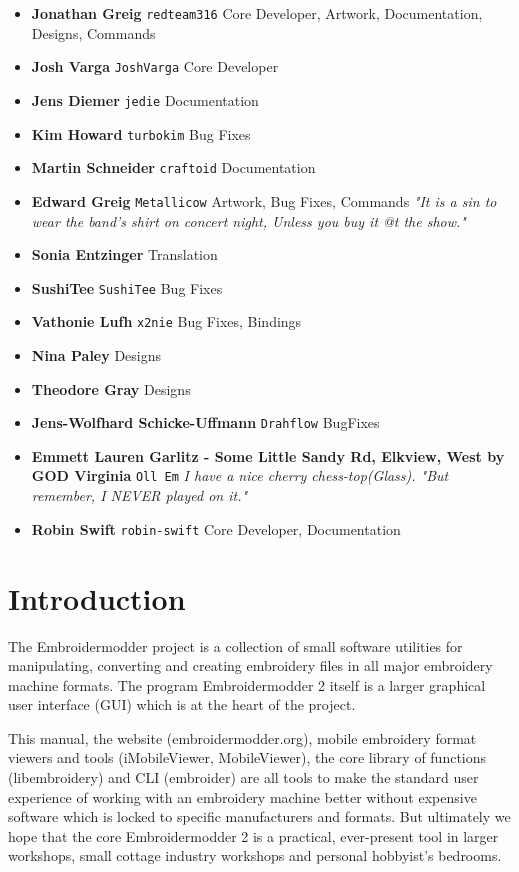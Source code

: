 \documentclass[a4paper, 11pt]{report}
\begin{document}
\begin{itemize}
\item \textbf{Jonathan Greig} \texttt{redteam316} Core Developer, Artwork, Documentation, Designs, Commands
\item \textbf{Josh Varga} \texttt{JoshVarga} Core Developer
\item \textbf{Jens Diemer} \texttt{jedie} Documentation
\item \textbf{Kim Howard} \texttt{turbokim} Bug Fixes
\item \textbf{Martin Schneider} \texttt{craftoid} Documentation
\item \textbf{Edward Greig} \texttt{Metallicow} Artwork, Bug Fixes, Commands \emph{"It is a sin to wear the band's shirt on concert night, Unless you buy it @t the show."}
\item \textbf{Sonia Entzinger} Translation
\item \textbf{SushiTee} \texttt{SushiTee} Bug Fixes
\item \textbf{Vathonie Lufh} \texttt{x2nie} Bug Fixes, Bindings
\item \textbf{Nina Paley} Designs
\item \textbf{Theodore Gray} Designs
\item \textbf{Jens-Wolfhard Schicke-Uffmann} \texttt{Drahflow} BugFixes
\item \textbf{Emmett Lauren Garlitz - Some Little Sandy Rd, Elkview, West by GOD Virginia} \texttt{Oll Em} \textit{I have a nice cherry chess-top(Glass). "But remember, I NEVER played on it."}
\item \textbf{Robin Swift} \texttt{robin-swift} Core Developer, Documentation
\end{itemize}

\chapter{Introduction}

The Embroidermodder project is a collection of small software utilities for manipulating, converting and creating embroidery files in all major embroidery machine formats. The program Embroidermodder 2 itself is a larger graphical user interface (GUI) which is at the heart of the project. 

This manual, the website (embroidermodder.org), mobile embroidery format viewers and tools (iMobileViewer, MobileViewer), the core library of functions (libembroidery) and CLI (embroider) are all tools to make the standard user experience of working with an embroidery machine better without expensive software which is locked to specific manufacturers and formats. But ultimately we hope that the core Embroidermodder 2 is a practical, ever-present tool in larger workshops, small cottage industry workshops and personal hobbyist’s bedrooms. 
\end{document}
